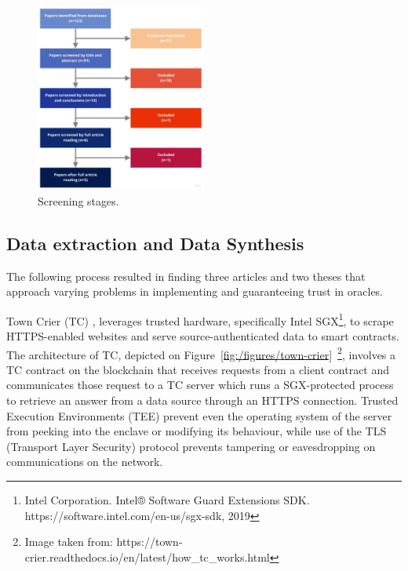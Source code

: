 \documentclass[final,3p,12pt,twocolumn]{elsarticle}
\begin{document}

\begin{figure}[H]
  \begin{center}
    \leavevmode
    \includegraphics[width=0.5\textwidth]{figures/paper-screening.jpg}
    \caption{Screening stages.}
    \label{fig:/figures/paper-screening}
  \end{center}
\end{figure}


\subsection{Data extraction and Data Synthesis}
The following process resulted in finding three articles and two theses that approach varying problems in implementing and guaranteeing trust in oracles.

Town Crier (TC) \citet{Zhang2016a}, leverages trusted hardware, specifically Intel SGX\footnote{Intel Corporation. Intel® Software Guard Extensions SDK. https://software.intel.com/en-us/sgx-sdk, 2019}, to scrape HTTPS-enabled websites and serve source-authenticated data to smart contracts. The architecture of TC, depicted on Figure~\ref{fig:/figures/town-crier}~\footnote{Image taken from: https://town-crier.readthedocs.io/en/latest/how\_tc\_works.html}, involves a TC contract on the blockchain that receives requests from a client contract and communicates those request to a TC server which runs a SGX-protected process to retrieve an answer from a data source through an HTTPS connection. Trusted Execution Environments (TEE) prevent even the operating system of the server from peeking into the enclave or modifying its behaviour, while use of the TLS (Transport Layer Security) protocol prevents tampering or eavesdropping on communications on the network.
\end{document}
